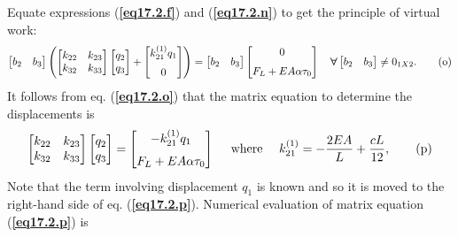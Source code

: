 \documentclass{AeroStructure-ERJohnson}
\begin{document}
\begin{example}
Equate expressions (\textbf{\ref{eq17.2.f}}) and (\textbf{\ref{eq17.2.n}}) to get the principle of virtual work:
\begin{equation}
\left[\begin{array}{@{}ll@{}}b_{2} & b_{3}\end{array}\right]\left(\left[\begin{array}{@{}ll@{}}k_{22} & k_{23} \\k_{32} & k_{33}\end{array}\right]\left[\begin{array}{@{}l@{}}q_{2} \\q_{3}\end{array}\right]+\left[\begin{array}{@{}c@{}}k_{21}^{(1)} q_{1} \\[6pt]0\end{array}\right]\right)=\left[\begin{array}{@{}ll@{}}b_{2} & b_{3}\end{array}\right]\left[\begin{array}{@{}c@{}}0 \\[6pt]F_{L}+E A \alpha \tau_{0}\end{array}\right] \quad \boldsymbol{\forall}\left[\begin{array}{@{}ll@{}}b_{2} & b_{3}\end{array}\right] \neq 0_{1 X 2}. \label{eq17.2.o}\tag{o}
\end{equation}
It follows from eq. (\textbf{\ref{eq17.2.o}}) that the matrix equation to determine the displacements is
\begin{equation}
\left[\begin{array}{@{}ll@{}}k_{22} & k_{23} \\k_{32} & k_{33}\end{array}\right]\left[\begin{array}{@{}l@{}}q_{2} \\q_{3}\end{array}\right]=\left[\begin{array}{@{}c@{}}-k_{21}^{(1)} q_{1} \\[6pt] F_{L}+E A \alpha \tau_{0}\end{array}\right] \quad \text { where } \quad k_{21}^{(1)}=-\frac{2 E A}{L}+\frac{c L}{12}, \label{eq17.2.p}\tag{p}
\end{equation}
Note that the term involving displacement $q_1$ is known and so it is moved to the right-hand side of eq. (\textbf{\ref{eq17.2.p}}). Numerical evaluation of matrix equation (\textbf{\ref{eq17.2.p}}) is

\end{example}
\end{document}
